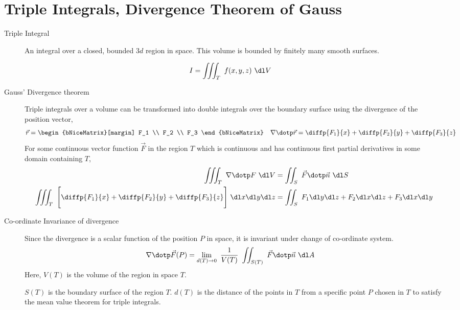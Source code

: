 \section{Triple Integrals, Divergence Theorem of Gauss}

\begin{description}
    \item[Triple Integral] An integral over a closed, bounded $ 3d $ region in space.
        This volume is bounded by finitely many smooth surfaces. \par
        \begin{align}
            I & = \iiint_T\ f(x, y, z)\ \dl V
        \end{align}

    \item[Gauss' Divergence theorem] Triple integrals over a volume can be transformed
        into double integrals over the boundary surface using the divergence of the
        position vector,
        \begin{align}
            \vec{r}              & = \begin{bNiceMatrix}[margin]
                                         F_1 \\ F_2 \\ F_3
                                     \end{bNiceMatrix}                       &
            \nabla \dotp \vec{r} & = \diffp {F_1}{x} + \diffp{F_2}{y} + \diffp{F_3}{z}
        \end{align}
        For some continuous vector function $ \vec{F} $ in the region $ T $ which is
        continuous and has continuous first partial derivatives in some domain
        containing $ T $,
        \begin{align}
            \iiint_T\ \nabla \dotp F\ \dl V           &
            = \iint_S\ \vec{F} \dotp \vec{n}\ \dl S                        \\
            \iiint_T\ \Bigg[\diffp {F_1}{x} + \diffp{F_2}{y}
            + \diffp{F_3}{z}\Bigg]\ \dl x \dl y \dl z &
            = \iint_S\ F_1 \dl y \dl z + F_2 \dl x \dl z + F_3 \dl x \dl y \\
        \end{align}

    \item[Co-ordinate Invariance of divergence] Since the divergence is a scalar
        function of the position $ P $ in space, it is invariant under change of
        co-ordinate system.
        \begin{align}
            \nabla \dotp \vec{F}(P) & = \lim_{d(T) \to 0}
            \ \frac{1}{V(T)}\ \iint_{S(T)}\ \vec{F} \dotp \vec{n}\ \dl A
        \end{align}
        Here, $ V(T) $ is the volume of the region in space $ T $. \par
        $ S(T) $ is the boundary surface of the region $ T $.
        $ d(T) $ is the distance of the points in $ T $ from a specific point $ P $
        chosen in $ T $ to satisfy the mean value theorem for triple integrals.
\end{description}

